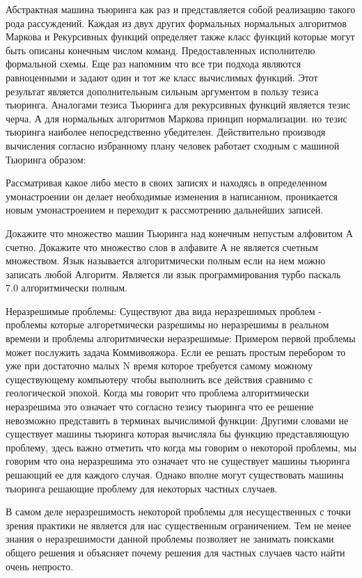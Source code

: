 Абстрактная машина тьюринга как раз и представляется собой реализацию такого рода рассуждений.
Каждая из двух других формальных нормальных алгоритмов Маркова и Рекурсивных функций определяет также класс функций которые могут быть описаны конечным числом команд. Предоставленных исполнителю формальной схемы. Еще раз напомним что все три подхода являются равноценными и задают один и тот же класс вычислимых функций. Этот результат является дополнительным сильным аргументом в пользу тезиса тьюринга. Аналогами тезиса Тьюринга для рекурсивных функций является тезис черча. А для нормальных алгоритмов Маркова принцип нормализации. но тезис тьюринга наиболее непосредственно убедителен. Действительно производя вычисления согласно избранному плану человек работает сходным с машиной Тьюринга образом:

Рассматривая какое либо место в своих записях и находясь в определенном умонастроении он делает необходимые изменения в написанном, проникается новым умонастроением и переходит к рассмотрению дальнейших записей.

Докажите что множество машин Тьюринга над конечным непустым алфовитом А счетно.
Докажите что множество слов в алфавите А не является счетным множеством.
Язык называется алгоритмически полным если на нем можно записать любой Алгоритм. Является ли язык программирования турбо паскаль 7.0 алгоритмически полным.

Неразрешимые проблемы:
Существуют два вида неразрешимых проблем - проблемы которые алгоретмически разрешимы но неразрешимы в реальном времени и проблемы алгоритмически неразрешимые:
Примером первой проблемы может послужить задача Коммивояжора. Если ее решать простым перебором то уже при достаточно малых N время которое требуется самому можному существующему компьютеру чтобы выполнить все действия сравнимо с геологической эпохой.
Когда мы говорит что проблема алгоритмически неразрешима это означает что согласно тезису тьюринга что ее решение невозможно представить в терминах вычислимой функции:
Другими словами не существует машины тьюринга которая вычисляла бы функцию представляющую проблему, здесь важно отметить что когда мы говорим о некоторой проблемы, мы говорим что она неразрешима это означает что не существует машины тьюринга решающий ее для каждого случая. Однако вполне могут существовать машины тьюринга решающие проблему для некоторых частных случаев.

В самом деле неразрешимость некоторой проблемы для несущественных с точки зрения практики не является для нас существенным ограничением. Тем не менее знания о неразрешимости данной проблемы позволяет не занимать поисками общего решения и объясняет почему решения для частных случаев часто найти очень непросто.

